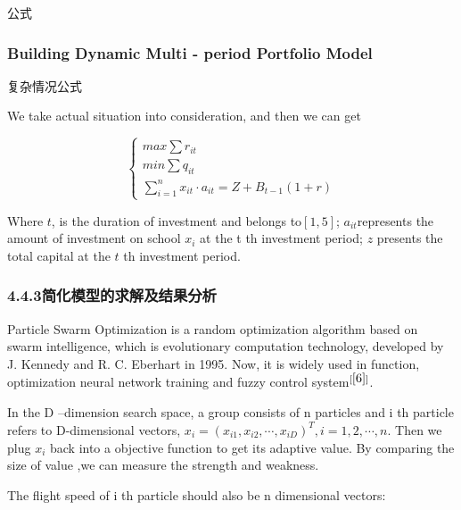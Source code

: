 \documentclass{mcmthesis}
\begin{document}
公式

\subsubsection{Building Dynamic Multi - period Portfolio Model}

复杂情况公式

We take actual situation into consideration, and then we can get 

\begin{equation}
\begin{cases}
max\sum r_{it}\\
min\sum q_{it}\\
\sum\limits_{i=1}^{n}x_{it}\cdot a_{it}=Z+B_{t-1}(1+r)
\end{cases}
\end{equation}

Where $t$, is the duration of investment and belongs to$[1,5]$; 
$a_{it}$represents the amount of investment on school $x_i$ at the t th investment period; $z$ presents the total capital at the $t$ th investment period.


\subsubsection{4.4.3简化模型的求解及结果分析}
Particle Swarm Optimization is a random optimization algorithm based on swarm intelligence, which is evolutionary computation technology, developed by J. Kennedy and R. C. Eberhart in 1995. Now, it is widely used in function, optimization neural network training and fuzzy control system$^{[\ref{6}]}$.\par

In the D –dimension search space, a group consists of n particles and i th particle refers to D-dimensional vectors, $x_i=(x_{i1},x_{i2},\cdots,x_{iD})^T,i=1,2,\cdots,n$. Then we plug $x_i$ back into a objective function to get its adaptive value. By comparing the size of value ,we can measure the strength and weakness.\par

The flight speed of i th particle should also be n dimensional vectors:
\end{document}

